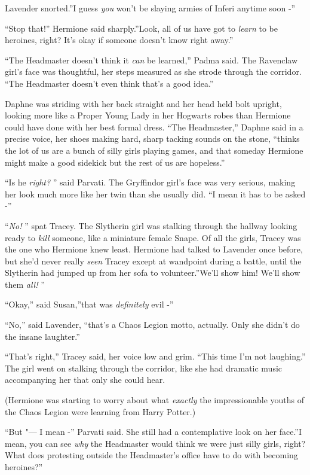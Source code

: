 Lavender snorted.''I guess \emph{you} won't be slaying armies of Inferi
anytime soon -''

``Stop that!'' Hermione said sharply.''Look, all of us have got to
\emph{learn} to be heroines, right? It's okay if someone doesn't know
right away.''

``The Headmaster doesn't think it \emph{can} be learned,'' Padma said.
The Ravenclaw girl's face was thoughtful, her steps measured as she
strode through the corridor. ``The Headmaster doesn't even think that's
a good idea.''

Daphne was striding with her back straight and her head held bolt
upright, looking more like a Proper Young Lady in her Hogwarts robes
than Hermione could have done with her best formal dress. ``The
Headmaster,'' Daphne said in a precise voice, her shoes making hard,
sharp tacking sounds on the stone, ``thinks the lot of us are a bunch of
silly girls playing games, and that someday Hermione might make a good
sidekick but the rest of us are hopeless.''

``Is he \emph{right?} '' said Parvati. The Gryffindor girl's face was very
serious, making her look much more like her twin than she usually did.
``I mean it has to be asked -''

``\emph{No!} '' spat Tracey. The Slytherin girl was stalking through the
hallway looking ready to \emph{kill} someone, like a miniature female
Snape. Of all the girls, Tracey was the one who Hermione knew least.
Hermione had talked to Lavender once before, but she'd never really
\emph{seen} Tracey except at wandpoint during a battle, until the
Slytherin had jumped up from her sofa to volunteer.''We'll show him!
We'll show them \emph{all!} ''

``Okay,'' said Susan,''that was \emph{definitely} evil -''

``No,'' said Lavender, ``that's a Chaos Legion motto, actually. Only she
didn't do the insane laughter.''

``That's right,'' Tracey said, her voice low and grim. ``This time I'm
not laughing.'' The girl went on stalking through the corridor, like she
had dramatic music accompanying her that only she could hear.

(Hermione was starting to worry about what \emph{exactly} the
impressionable youths of the Chaos Legion were learning from Harry
Potter.)

``But "--- I mean -'' Parvati said. She still had a contemplative look on
her face.''I mean, you can see \emph{why} the Headmaster would think we
were just silly girls, right? What does protesting outside the
Headmaster's office have to do with becoming heroines?''

